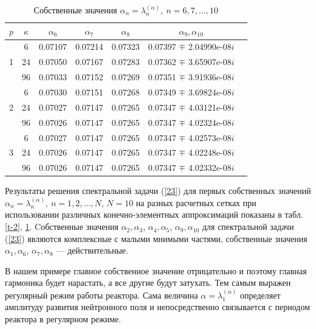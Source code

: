 \documentclass[authoryear]{elsarticle}
\begin{document}
\begin{table}[h]
\caption{Собственные значения $\alpha_n = \lambda_n^{(\alpha )}, \ n = 6,7, ..., 10$}
\label{t-3}
\begin{center}
\begin{tabular}{ccccccc}
\hline
$p$ & $\kappa$ & $\alpha_6$ &  $\alpha_7$ & $\alpha_8$ &  $\alpha_9, \alpha_{10}$ \\ 
\hline
& 6 & 0.07107  & 0.07214  & 0.07323  & 0.07397 $\mp$ 2.04990e-08$i$ \\
1 & 24 & 0.07050  & 0.07167  & 0.07283  & 0.07362 $\mp$ 3.65907e-08$i$ \\
& 96 & 0.07033  & 0.07152  & 0.07269  & 0.07351 $\mp$ 3.91936e-08$i$  \\
\hline
& 6  & 0.07030  & 0.07151  & 0.07268  & 0.07349 $\mp$ 3.69824e-08$i$ \\
2 & 24 & 0.07027  & 0.07147  & 0.07265  & 0.07347 $\mp$ 4.03121e-08$i$ \\
& 96  & 0.07026  & 0.07147  & 0.07265  & 0.07347 $\mp$ 4.02324e-08$i$ \\
\hline
& 6 & 0.07027  & 0.07147  & 0.07265  & 0.07347 $\mp$ 4.02573e-08$i$ \\
3 & 24 & 0.07026  & 0.07147  & 0.07265  & 0.07347 $\mp$ 4.02248e-08$i$ \\
& 96 & 0.07026  & 0.07147  & 0.07265  & 0.07347 $\mp$ 4.02332e-08$i$ \\
\hline
\end{tabular}
\end{center}
\end{table}

Результаты решения спектральной задачи (\ref{23}) для первых собственных
значений $\alpha_n = \lambda_n^{(\alpha)}, \ n = 1,2, ..., N$, $ N=10$
на разных расчетных сетках при использовании различных
конечно-элементных аппроксимаций показаны в табл.\ref{t-2}, \ref{t-3}. Cобственные значения $\alpha_2, \alpha_3$, $\alpha_4, \alpha_5$, $\alpha_9, \alpha_{10}$ 
для спектральной задачи (\ref{23}) являются комплексные с малыми мнимыми частями, собственные значения $\alpha_1, \alpha_6$, $\alpha_7, \alpha_8$ --- действительные.

В нашем примере главное собственное значение
отрицательно и поэтому главная гармоника
будет нарастать, а все другие будут затухать. Тем самым выражен регулярный режим 
работы реактора. Сама величина $\alpha = \lambda_1^{(\alpha)}$ определяет амплитуду 
развития нейтронного поля и непосредственно связывается с периодом реактора
в регулярном режиме.
\end{document}
